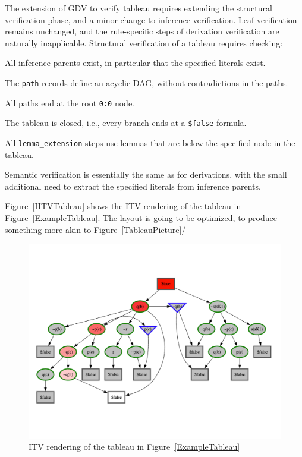 \documentclass[runningheads]{llncs}
\newcommand{\smalltt}[1]{\small \texttt{#1}}
\newenvironment{packed_itemize}{
\vspace*{-0.2em}
\begin{itemize}
\setlength{\partopsep}{0pt}
\setlength{\itemsep}{1pt}
\setlength{\parskip}{0pt}
\setlength{\parsep}{0pt}
}{\end{itemize}}
\begin{document}
{The extension of GDV to verify tableau requires extending the structural verification phase,
and a minor change to inference verification.
Leaf verification remains unchanged, and the rule-specific steps of derivation verification
are naturally inapplicable.
Structural verification of a tableau requires checking:
\begin{packed_itemize}
\item All inference parents exist, in particular that the specified literals exist.
\item The {\smalltt{path}} records define an acyclic DAG, without contradictions in the paths.
\item All paths end at the root {\smalltt{0:0}} node.
\item The tableau is closed, i.e., every branch ends at a {\smalltt{\$false}} formula.
\item All {\tt lemma\_extension} steps use lemmas that are below the specified node in the tableau.
\end{packed_itemize}
Semantic verification is essentially the same as for derivations, with the small additional need 
to extract the specified literals from inference parents.

Figure~\ref{IITVTableau} shows the ITV rendering of the tableau in Figure~\ref{ExampleTableau}.
The layout is going to be optimized, to produce something more akin to Figure~\ref{TableauPicture}/

\begin{figure}[htb]
\centering
\includegraphics[width=1.0\textwidth]{PaperFOFITV.pdf}
\vspace*{-1em}
\caption{ITV rendering of the tableau in Figure~\ref{ExampleTableau}}
\label{ITVTableau}
\end{figure}

}
\end{document}
